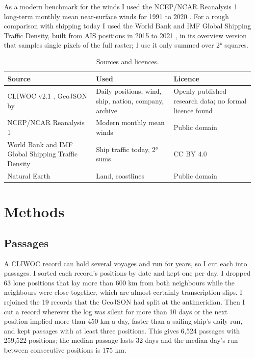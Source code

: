 \documentclass[11pt,a4paper]{article}
\begin{document}
As a modern benchmark for the winds I used the NCEP/NCAR Reanalysis 1 long-term monthly mean near-surface winds for 1991 to 2020 \citep{kalnay1996}. For a rough comparison with shipping today I used the World Bank and IMF Global Shipping Traffic Density, built from AIS positions in 2015 to 2021 \citep{cerdeiro2020}, in its overview version that samples single pixels of the full raster; I use it only summed over 2° squares.

\begin{table}[tbp]\centering\small\caption{Sources and licences.}\label{tab:sources}
\begin{tabular}{>{\raggedright\arraybackslash}p{4.2cm}>{\raggedright\arraybackslash}p{6.8cm}>{\raggedright\arraybackslash}p{3.4cm}}\toprule Source & Used & Licence\\\midrule
CLIWOC v2.1 \citep{garciaherrera2005}, GeoJSON by \citet{correoso} & Daily positions, wind, ship, nation, company, archive & Openly published research data; no formal licence found\\
NCEP/NCAR Reanalysis 1 \citep{kalnay1996} & Modern monthly mean winds & Public domain\\
World Bank and IMF Global Shipping Traffic Density \citep{cerdeiro2020} & Ship traffic today, 2° sums & CC BY 4.0\\
Natural Earth & Land, coastlines & Public domain\\
\bottomrule\end{tabular}\end{table}

\section{Methods}
\subsection{Passages}
A CLIWOC record can hold several voyages and run for years, so I cut each into passages. I sorted each record's positions by date and kept one per day. I dropped 63 lone positions that lay more than 600 km from both neighbours while the neighbours were close together, which are almost certainly transcription slips. I rejoined the 19 records that the GeoJSON had split at the antimeridian. Then I cut a record wherever the log was silent for more than 10 days or the next position implied more than 450 km a day, faster than a sailing ship's daily run, and kept passages with at least three positions. This gives 6,524 passages with 259,522 positions; the median passage lasts 32 days and the median day's run between consecutive positions is 175 km.
\end{document}
